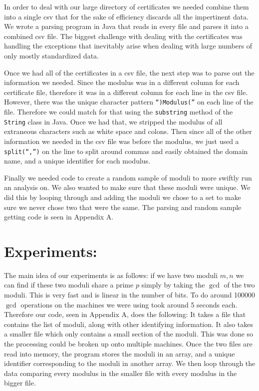 \documentclass[11pt,twoside]{article}
\newcommand{\ty}[1]{\texttt{#1}}
\begin{document}
\begin{multicols}{2}
In order to deal with our large directory of certificates we needed combine
them into a single csv that for the sake of efficiency discards all the
impertinent data.  We wrote a parsing program in Java that reads in every file
and parses it into a combined csv file. The biggest challenge with dealing with
the certificates was handling the exceptions that inevitably arise when dealing
with large numbers of only mostly standardized data. 

Once we had all of the certificates in a csv file, the next step was to parse
out the information we needed. Since the modulus was in a different column for
each certificate file, therefore it was in a different column for each line in
the csv file.  However, there was the unique character pattern \ty{``$)$Modulus$($''} on each line of the file. Therefore we could match for that using the
\ty{substring} method of the \ty{String} class in Java. Once we had that, we
stripped the modulus of all extraneous characters such as white space and
colons. Then since all of the other information we needed in the csv file was
before the modulus, we just used a \ty{split(``,'')} on the line to split
around commas and easily obtained the domain name, and a unique identifier for
each modulus.

Finally we needed code to create a random sample of moduli to more swiftly run
an analysis on. We also wanted to make sure that these moduli were unique. We
did this by looping through and adding the moduli we chose to a set to make sure
we never chose two that were the same. The parsing and random sample getting
code is seen in Appendix A.


\section{Experiments:}
The main idea of our experiments is as follows: if we have two moduli $m, n$ we
can find if these two moduli share a prime $p$ simply by taking the $\gcd$ of
the two moduli. This is very fast and is linear in the number of bits. To do
around 100000 $\gcd$ operations on the machines we were using took around 5
seconds each. Therefore our code, seen in Appendix A, does the following: It
takes a file that contains the list of moduli, along with other identifying 
information. It also takes a smaller file which only contains a small section of
the moduli. This was done so the processing could be broken up onto multiple
machines. Once the two files are read into memory, the program stores the moduli
in an array, and a unique identifier corresponding to the moduli in another
array. We then loop through the data comparing every modulus in the smaller file
with every modulus in the bigger file.


\end{multicols}
\end{document}
